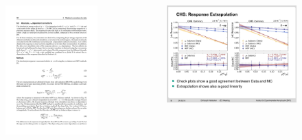 {\begin{columns}[T]
		\vspace*{-0.4cm}
		\begin{figure}[T]
				\centering
				\includegraphics[width=3 cm]{images/l3equations.pdf}
				\label{fig:L3Residual_equations}
		\end{figure}
		\vspace*{-0.3cm}                
		\begin{figure}[T]
				\centering
				\includegraphics[width=.75\textwidth]{images/l3res.pdf}
				\label{fig:L3Residual}
		\end{figure}

	\end{columns}
}
